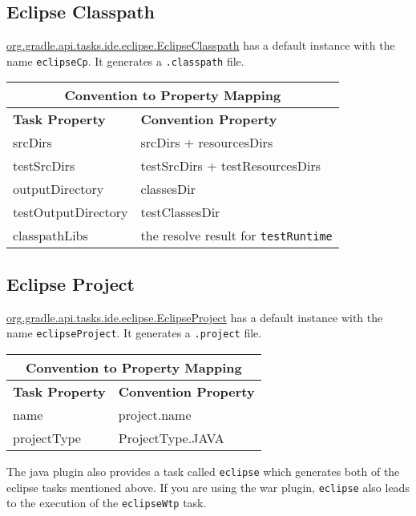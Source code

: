 \subsection{Eclipse Classpath} %
\label{sub:eclipse_classpath}
\href{\API tasks/ide/eclipse/EclipseClasspath.html}{org.gradle.api.tasks.ide.eclipse.EclipseClasspath} has a default instance with the name \texttt{eclipseCp}. It generates a \texttt{.classpath} file.
\begin{center}
	\begin{tabular}{|l|l|} \hline
		\multicolumn{2}{|c|}{Convention to Property Mapping} \\ \hline
	    \textbf{Task Property} & \textbf{Convention Property} \\ \hline
		srcDirs & srcDirs + resourcesDirs \\ \hline
		testSrcDirs & testSrcDirs + testResourcesDirs \\ \hline
		outputDirectory & classesDir \\ \hline
		testOutputDirectory & testClassesDir \\ \hline
		classpathLibs & the resolve result for \texttt{testRuntime} \\ \hline
	\end{tabular} 
\end{center}
\subsection{Eclipse Project} %
\label{sub:eclipse_project}
\href{\API tasks/ide/eclipse/EclipseProject.html}{org.gradle.api.tasks.ide.eclipse.EclipseProject} has a default instance with the name \texttt{eclipseProject}. It generates a \texttt{.project} file.
\begin{center}
	\begin{tabular}{|l|l|} \hline
		\multicolumn{2}{|c|}{Convention to Property Mapping} \\ \hline
	    \textbf{Task Property} & \textbf{Convention Property} \\ \hline
		name & project.name \\ \hline
		projectType & ProjectType.JAVA \\ \hline
	\end{tabular} 
\end{center}
The java plugin also provides a task called \texttt{eclipse} which generates both of the eclipse tasks mentioned above. If you are using the war plugin, \texttt{eclipse} also leads to the execution of the \texttt{eclipseWtp} task.

